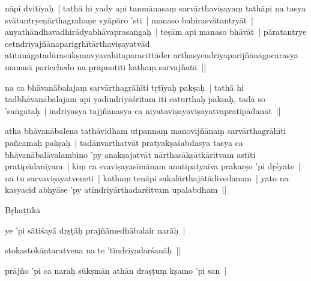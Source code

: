 \documentclass[article,12pt,a4paper]{memoir}%
\newcounter{parCount}
\begin{document}
	  \pstart \leavevmode%
	\label{thakur75-8.17}nāpi dvitīyaḥ | tathā hi yady api tanmānasaṃ sarvārthaviṣayaṃ tathāpi na tasya svātantryeṇārthagrahaṇe vyāpāro 'sti | manaso bahirasvātantryāt | anyathāndhavadhirādyabhāvaprasaṅgaḥ | teṣām api manaso bhāvāt | pāratantrye cetndriyajñānaparigṛhītārthaviṣayatvād atītānāgatadūrasūkṣmavyavahitaparacittāder arthasyendriyaparijñānāgocarasya manasā paricchedo na prāpnotīti kathaṃ sarvajñatā || 
	{}
	\pend%
      

	  \pstart \leavevmode%
	\label{thakur75-8.22}na ca bhāvanābalajaṃ sarvārthagrāhīti tṛtīyaḥ pakṣaḥ | tathā hi tadbhāvanābalajam api yadīndriyāśritam iti caturthaḥ pakṣaḥ, tadā so 'saṅgataḥ | indriyasya tajjñānasya ca niyataviṣayaviṣayatvapratipādanāt || 
	{}
	\pend%
      

	  \pstart \leavevmode%
	\label{thakur75-8.25}atha bhāvanābalena tathāvidham utpannaṃ manovijñānaṃ sarvārthagrāhīti pañcamaḥ pakṣaḥ | tadānvarthatvāt pratyakṣaśabdasya tasya ca bhāvanābalāvalambino 'py anakṣajatvāt nārthasākṣātkāritvam astīti pratipādanīyam | kiṃ ca svaviṣayasīmānam anatipatyaiva prakarṣo 'pi dṛśyate | na tu sarvaviṣayatveneti | kathaṃ tenāpi sakalārthajātādivedanam | yato na kasyacid abhyāse 'py atīndriyārthadarśitvam upalabdham || 
	{}
	\pend%
      

	  \pstart \leavevmode%
	\label{thakur75-8.30}Bṛhaṭṭīkā 
	{}
	\pend%
      

	  \pstart \leavevmode%
	ye 'pi sātiśayā dṛṣṭāḥ prajñāmedhābalair narāḥ | 
	{}
	\pend%
      

	  \pstart \leavevmode%
	stokastokāntaratvena na te 'tīndriyadarśanāḥ || 
	{}
	\pend%
      

	  \pstart \leavevmode%
	prājño 'pi ca naraḥ sūkṣmān athān draṣṭuṃ kṣamo 'pi san | 
	{}
	\pend%
      
\end{document}
